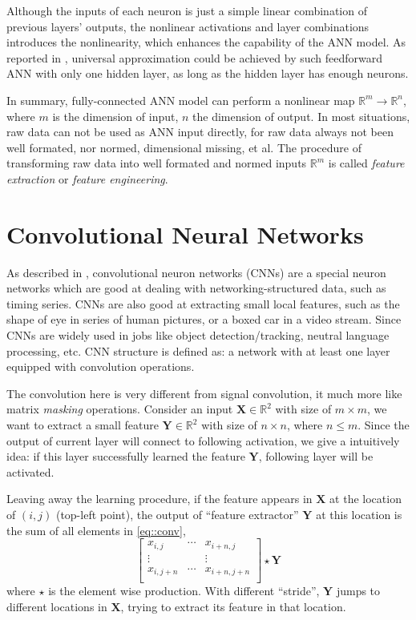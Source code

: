 Although the inputs of each neuron is just a simple linear combination of previous
layers' outputs, the nonlinear activations and layer combinations introduces the
nonlinearity, which enhances the capability of the ANN model. 
As reported in \cite{hornik1989multilayer}, universal approximation could be achieved by
such feedforward ANN with only one hidden layer, as long as the hidden layer has enough neurons.

In summary, fully-connected ANN model can perform a nonlinear map $\mathbb{R}^m \to \mathbb{R}^n$,
where $m$ is the dimension of input, $n$ the dimension of output. In most situations, raw data
can not be used as ANN input directly, for raw data always not been well formated, nor normed, 
dimensional missing, et al.
The procedure of transforming raw data into well formated and normed inputs $\mathbb{R}^m$ is called
\textit{feature extraction} or \textit{feature engineering}.

\section{Convolutional Neural Networks} \label{sec::intro_cnn}
As described in \cite{Goodfellow2016Deep, lecun2015deep, Zhou2016ML}, convolutional neuron networks (CNNs) are
a special neuron networks which are good at dealing with networking-structured data, such as timing series.
CNNs are also good at extracting small local features, such as the shape of eye in series of human pictures,
or a boxed car in a video stream.
Since CNNs are widely used in jobs like object detection/tracking, neutral language processing, etc.
CNN structure is defined as: a network with at least one layer equipped with convolution operations.

The convolution here is very different from signal convolution, it much more like matrix \textit{masking}
operations.
Consider an input $\mathbf{X} \in \mathbb{R}^2$ with size of $m \times m$, we want to extract a small feature
$\mathbf{Y} \in \mathbb{R}^2$ with size of $n \times n$, where $n \le m$. Since the output of current layer
will connect to following activation, we give a intuitively idea:
if this layer successfully learned the feature $\mathbf{Y}$,
following layer will be activated.

Leaving away the learning procedure, if the feature appears in $\mathbf{X}$ at the location of $(i,j)$ (top-left point),
the output of ``feature extractor'' $\mathbf{Y}$ at this location is the sum of all elements in \eqref{eq::conv},
\begin{equation} \label{eq::conv}
    \begin{bmatrix}
    x_{i,j} & \cdots & x_{i+n,j} \\
    \vdots  &        & \vdots    \\
    x_{i,j+n} & \cdots & x_{i+n,j+n} \\
    \end{bmatrix}
    \star \mathbf{Y}
\end{equation}
where $\star$ is the element wise production. With different ``stride'', $\mathbf{Y}$ jumps to different
locations in $\mathbf{X}$, trying to extract its feature in that location.

